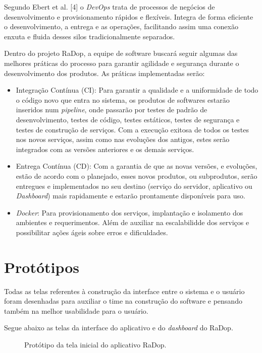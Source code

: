 Segundo Ebert et al. [4] o \textit{DevOps} trata de processos de negócios de desenvolvimento e provisionamento rápidos e flexíveis. Integra de forma eficiente o desenvolvimento, a entrega e as operações, facilitando assim uma conexão enxuta e fluida desses silos tradicionalmente separados.

Dentro do projeto RaDop, a equipe de software buscará seguir algumas das melhores práticas do processo para garantir agilidade e segurança durante o desenvolvimento dos produtos. As práticas implementadas serão:
\begin{itemize}
    \item Integração Contínua (CI): Para garantir a qualidade e a uniformidade de todo o código novo que entra no sistema, os produtos de softwares estarão inseridos num \textit{pipeline}, onde passarão por testes de padrão de desenvolvimento, testes de código, testes estáticos, testes de segurança e testes de construção de serviços. Com a execução exitosa de todos os testes nos novos serviços, assim como nas evoluções dos antigos, estes serão integrados com as versões anteriores e os demais serviços.
    \item Entrega Contínua (CD): Com a garantia de que as novas versões, e evoluções, estão de acordo com o planejado, esses novos produtos, ou subprodutos, serão entregues e implementados no seu destino (serviço do servidor, aplicativo ou \textit{Dashboard}) mais rapidamente e estarão prontamente disponíveis para uso.
    \item \textit{Docker}: Para provisionamento dos serviços, implantação e isolamento dos ambientes e requerimentos. Além de auxiliar na escalabilidde dos serviços e possibilitar ações ágeis sobre erros e dificuldades.
\end{itemize}

\section{Protótipos}

Todas as telas referentes à construção da interface entre o sistema e o usuário foram desenhadas para auxiliar o time na construção do software e pensando também na melhor usabilidade para o usuário.

Segue abaixo as telas da interface do aplicativo e do \textit{dashboard} do RaDop.

\begin{figure}[ht]
	\caption{\label{fig:tela_inicial} Protótipo da tela inicial do aplicativo RaDop.}
\end{figure}\newpage

